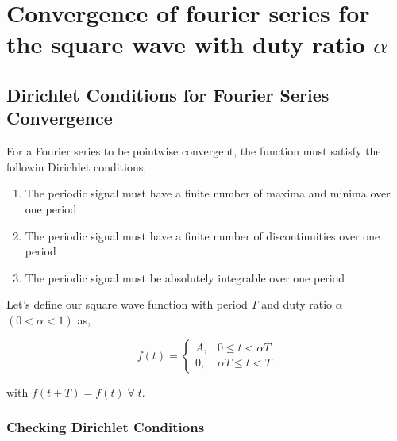 \documentclass[12pt]{article}
\begin{document}
\title{}
\author{}

\section{Convergence of fourier series for the square wave with duty ratio $\alpha$}

\subsection{Dirichlet Conditions for Fourier Series Convergence}

For a Fourier series to be pointwise convergent, the function must satisfy the followin Dirichlet conditions,

\begin{enumerate}
\item The periodic signal must have a finite number of maxima and minima over one period
\item The periodic signal must have a finite number of discontinuities over one period
\item The periodic signal must be absolutely integrable over one period
\end{enumerate}

Let's define our square wave function with period $T$ and duty ratio $\alpha$ $(0 < \alpha < 1)$ as,

\begin{equation}
f(t) =
\begin{cases}
A, & 0 \leq t < \alpha T \\
0, & \alpha T \leq t < T
\end{cases}
\end{equation}

with $f(t+T) = f(t) \; \forall \; t$.

\subsubsection{Checking Dirichlet Conditions}
\end{document}
